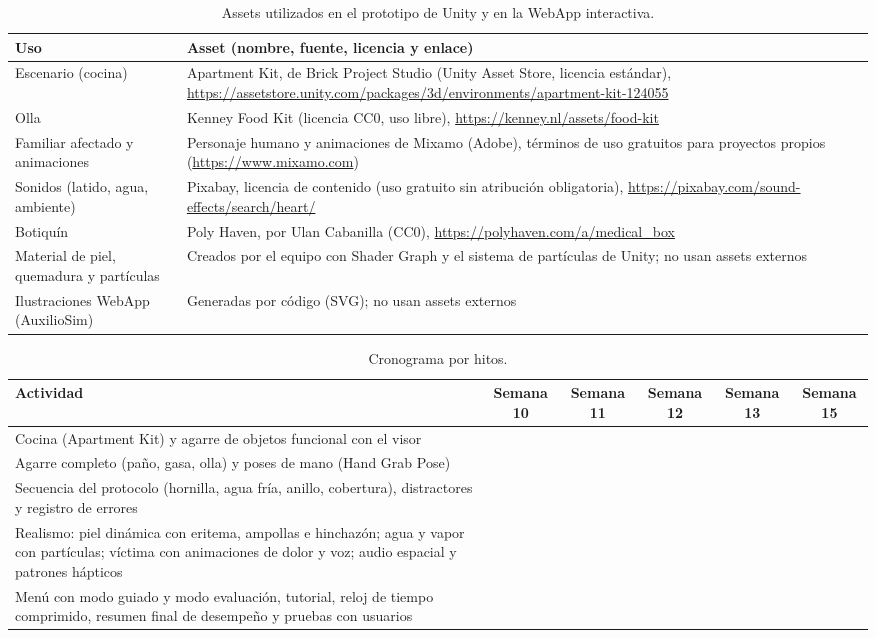 \documentclass[11pt,letterpaper]{article}
\newcommand{\cmark}{\ding{51}}
\begin{document}
\begin{table}[H]
\centering
\small
\begin{tabularx}{\textwidth}{L{3.2cm} X}
\toprule
\textbf{Uso} & \textbf{Asset (nombre, fuente, licencia y enlace)} \\
\midrule
Escenario (cocina) & Apartment Kit, de Brick Project Studio (Unity Asset Store, licencia estándar), \url{https://assetstore.unity.com/packages/3d/environments/apartment-kit-124055} \\
Olla & Kenney Food Kit (licencia CC0, uso libre), \url{https://kenney.nl/assets/food-kit} \\
Familiar afectado y animaciones & Personaje humano y animaciones de Mixamo (Adobe), términos de uso gratuitos para proyectos propios (\url{https://www.mixamo.com}) \\
Sonidos (latido, agua, ambiente) & Pixabay, licencia de contenido (uso gratuito sin atribución obligatoria), \url{https://pixabay.com/sound-effects/search/heart/} \\
Botiquín & Poly Haven, por Ulan Cabanilla (CC0), \url{https://polyhaven.com/a/medical_box} \\
Material de piel, quemadura y partículas & Creados por el equipo con Shader Graph y el sistema de partículas de Unity; no usan assets externos \\
Ilustraciones WebApp (AuxilioSim) & Generadas por código (SVG); no usan assets externos \\
\bottomrule
\end{tabularx}
\caption{Assets utilizados en el prototipo de Unity y en la WebApp interactiva.}
\label{tab:assets}
\end{table}

\begin{table}[H]
\centering
\small
\begin{tabular}{L{5.4cm} c c c c c}
\toprule
\textbf{Actividad} & \textbf{Semana 10} & \textbf{Semana 11} & \textbf{Semana 12} & \textbf{Semana 13} & \textbf{Semana 15} \\
\midrule
Cocina (Apartment Kit) y agarre de objetos funcional con el visor & \cmark & & & & \\
\addlinespace
Agarre completo (paño, gasa, olla) y poses de mano (Hand Grab Pose) & & \cmark & & & \\
\addlinespace
Secuencia del protocolo (hornilla, agua fría, anillo, cobertura), distractores y registro de errores & & & \cmark & & \\
\addlinespace
Realismo: piel dinámica con eritema, ampollas e hinchazón; agua y vapor con partículas; víctima con animaciones de dolor y voz; audio espacial y patrones hápticos & & & & \cmark & \\
\addlinespace
Menú con modo guiado y modo evaluación, tutorial, reloj de tiempo comprimido, resumen final de desempeño y pruebas con usuarios & & & & & \cmark \\
\bottomrule
\end{tabular}
\caption{Cronograma por hitos.}
\label{tab:cronograma}
\end{table}
\end{document}
